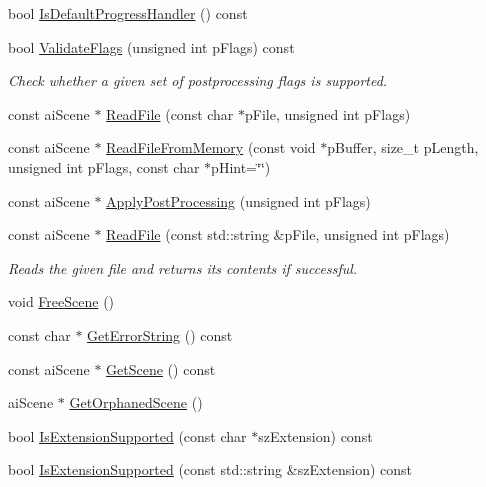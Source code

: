 \begin{DoxyCompactItemize}
\item 
bool \hyperlink{class_assimp_1_1_importer_a2d60d970eddf8f9d35b6e9b54214cedd}{Is\-Default\-Progress\-Handler} () const 
\item 
bool \hyperlink{class_assimp_1_1_importer_a780329e2dd0406e930291cf8ab9deb99}{Validate\-Flags} (unsigned int p\-Flags) const 
\begin{DoxyCompactList}\small\item\em Check whether a given set of postprocessing flags is supported. \end{DoxyCompactList}\item 
const ai\-Scene $\ast$ \hyperlink{class_assimp_1_1_importer_a174418ab41d5b8bc51a044895cb991e5}{Read\-File} (const char $\ast$p\-File, unsigned int p\-Flags)
\item 
const ai\-Scene $\ast$ \hyperlink{class_assimp_1_1_importer_a9b3c5e8b1042702f449e84a95b3324f6}{Read\-File\-From\-Memory} (const void $\ast$p\-Buffer, size\-\_\-t p\-Length, unsigned int p\-Flags, const char $\ast$p\-Hint=\char`\"{}\char`\"{})
\item 
const ai\-Scene $\ast$ \hyperlink{class_assimp_1_1_importer_a5872e749c1451fee64183fc14f1fc81d}{Apply\-Post\-Processing} (unsigned int p\-Flags)
\item 
const ai\-Scene $\ast$ \hyperlink{class_assimp_1_1_importer_a339882c7acb47d5b5110bbd078d870a9}{Read\-File} (const std\-::string \&p\-File, unsigned int p\-Flags)
\begin{DoxyCompactList}\small\item\em Reads the given file and returns its contents if successful. \end{DoxyCompactList}\item 
void \hyperlink{class_assimp_1_1_importer_a53dafc3046abc33365a07c605716c5d4}{Free\-Scene} ()
\item 
const char $\ast$ \hyperlink{class_assimp_1_1_importer_a23bab5ba8cb9b6886c690a610766668b}{Get\-Error\-String} () const 
\item 
const ai\-Scene $\ast$ \hyperlink{class_assimp_1_1_importer_a26fd479a6a955969c1377fa59f92db66}{Get\-Scene} () const 
\item 
ai\-Scene $\ast$ \hyperlink{class_assimp_1_1_importer_a60eb9042fb85bfbd61a863e131a56ecd}{Get\-Orphaned\-Scene} ()
\item 
bool \hyperlink{class_assimp_1_1_importer_a9146ea75c33c0aac0310195346877388}{Is\-Extension\-Supported} (const char $\ast$sz\-Extension) const 
\item 
bool \hyperlink{class_assimp_1_1_importer_a5b01905366f5bf8d1f89d51f755bf7d2}{Is\-Extension\-Supported} (const std\-::string \&sz\-Extension) const 

\end{DoxyCompactItemize}
